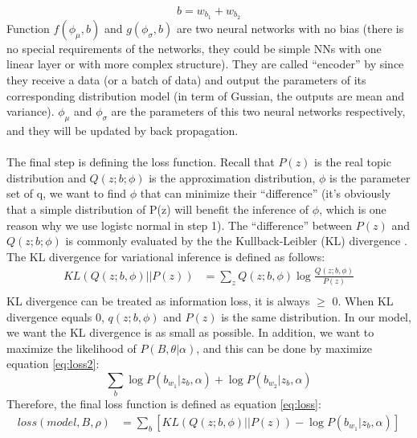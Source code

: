 \begin{equation}
    b = w_{b_1} + w_{b_2}
\label{eq:biterm2}
\end{equation}
Function $f(\phi_{\mu}, b)$ and $g(\phi_{\sigma}, b)$ are two neural networks with no bias (there is no special requirements of the networks, they could be simple NNs with one linear layer or with more complex structure). They are called ``encoder'' by \cite{kingma2013auto} since they receive a data (or a batch of data) and output the parameters of its corresponding distribution model (in term of Gussian, the outputs are mean and variance). $\phi_{\mu}$ and $\phi_{\sigma}$ are the parameters of this two neural networks respectively, and they will be updated by back propagation.\\\\
The final step is defining the loss function. Recall that $P(z)$ is the real topic distribution and $Q(z;b;\phi)$ is the approximation distribution, $\phi$ is the parameter set of q, we want to find $\phi$ that can minimize their ``difference'' (it's obviously that a simple distribution of P(z) will benefit the inference of $\phi$, which is one reason why we use logistc normal in step 1). The ``difference'' between $P(z)$ and $Q(z;b;\phi)$ is commonly evaluated by the  the Kullback-Leibler (KL) divergence \cite{yang2017understanding}. The KL divergence for variational inference is defined as follows: 
\begin{equation}
    \begin{aligned}
        KL(Q(z;b,\phi)||P(z)) & = \sum_zQ(z;b,\phi)\log\frac{Q(z;b,\phi)}{P(z)}\\
    \end{aligned} 
    \label{eq:KL}
\end{equation}
KL divergence can be treated as information loss, it is always $\geq$ 0. When KL divergence equals 0, $q(z;b,\phi)$ and $P(z)$ is the same distribution. In our model, we want the KL divergence is as small as possible. In addition, we want to maximize the likelihood of $P(B,\theta|\alpha)$, and this can be done by maximize equation \ref{eq:loss2}:
\begin{equation}
    \sum_b\log P(b_{w_1}|z_b,\alpha)+\log P(b_{w_2}|z_b,\alpha)
    \label{eq:loss2}
\end{equation}
Therefore, the final loss function is defined as equation \ref{eq:loss}:
\begin{equation}
    \begin{aligned}
        loss(model, B, \rho) & = \sum_b\left[KL(Q(z;b,\phi)||P(z))-\log P(b_{w_1}|z_b,\alpha)\right] 
    \end{aligned}    
    \label{eq:loss}
\end{equation}
